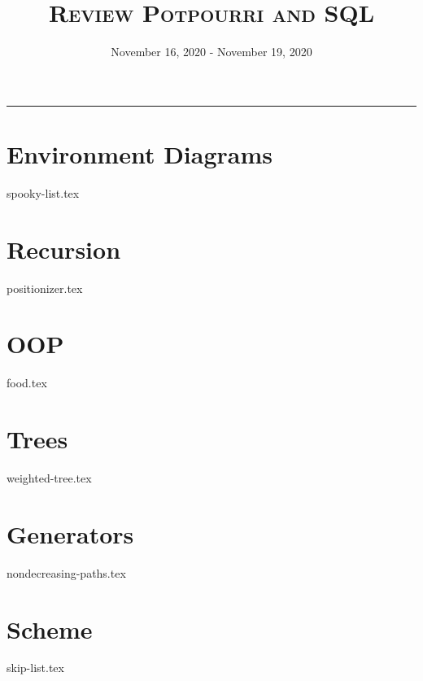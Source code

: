 \documentclass{exam}
\title{\textsc{Review Potpourri and SQL}}
\date{November 16, 2020 - November 19, 2020}
\begin{document}
\maketitle\rule{\textwidth}{0.15em}
\fontsize{12}{15}\selectfont

\section{Environment Diagrams}
\begin{questions}
{spooky-list.tex}
\end{questions}
\newpage

\section{Recursion}
\begin{questions}
{positionizer.tex}
\end{questions}
\newpage

\section{OOP}
\begin{questions}
{food.tex}
\end{questions}
\newpage

\section{Trees}
\begin{questions}
{weighted-tree.tex}
\end{questions}
\newpage

\section{Generators}
\begin{questions}
{nondecreasing-paths.tex}
\end{questions}
\newpage

\section{Scheme}
\begin{questions}
{skip-list.tex}
\end{questions}
\end{document}
